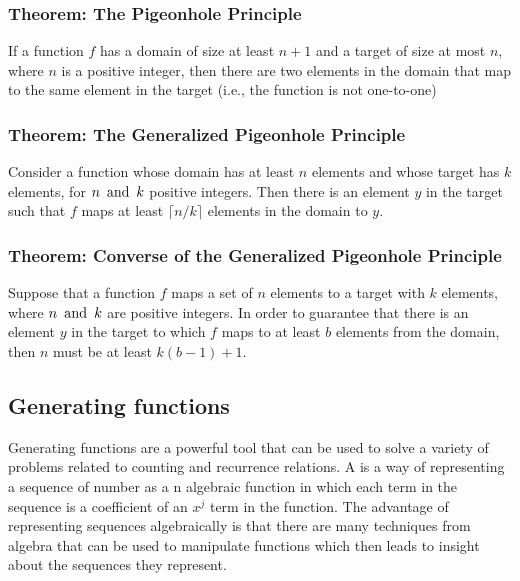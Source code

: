 \subsubsection*{Theorem: The Pigeonhole Principle}
If a function $f$ has a domain of size at least $n+1$ and a target of size at most $n$, where $n$ is a positive integer, then there are two elements in the domain that map to the same element in the target (i.e., the function is not one-to-one)

\subsubsection*{Theorem: The Generalized Pigeonhole Principle}
Consider a function whose domain has at least $n$ elements and whose target has $k$ elements, for $n \operatorname{~\text{and}~} k$ positive integers. Then there is an element $y$ in the target such that $f$ maps at least $\lceil n/k \rceil$ elements in the domain to $y$.

\subsubsection*{Theorem: Converse of the Generalized Pigeonhole Principle}
Suppose that a function $f$ maps a set of $n$ elements to a target with $k$ elements, where $n \operatorname{~\text{and}~} k$ are positive integers. In order to guarantee that there is an element $y$ in the target to which $f$ maps to at least $b$ elements from the domain, then $n$ must be at least $k(b-1)+1$.

\subsection{Generating functions}
Generating functions are a powerful tool that can be used to solve a variety of problems related to counting and recurrence relations. A  is a way of representing a sequence of number as a n algebraic function in which each term in the sequence is a coefficient of an $x^j$ term in the function. The advantage of representing sequences algebraically is that there are many techniques from algebra that can be used to manipulate functions which then leads to insight about the sequences they represent.